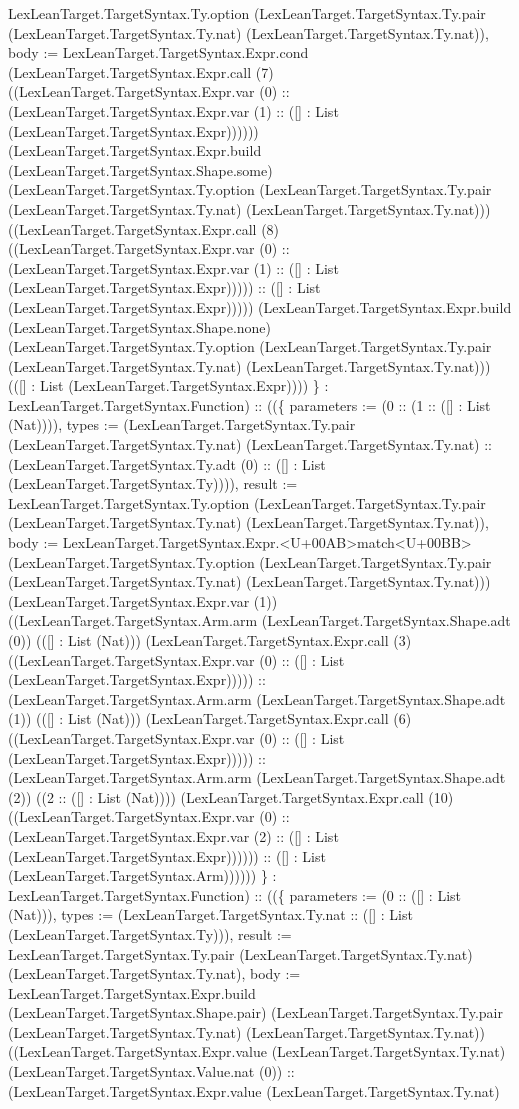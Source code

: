 \documentclass[11pt]{article}
\begin{document}
LexLeanTarget.TargetSyntax.Ty.option (LexLeanTarget.TargetSyntax.Ty.pair (LexLeanTarget.TargetSyntax.Ty.nat) (LexLeanTarget.TargetSyntax.Ty.nat)), body := LexLeanTarget.TargetSyntax.Expr.cond (LexLeanTarget.TargetSyntax.Expr.call (7) ((LexLeanTarget.TargetSyntax.Expr.var (0) :: (LexLeanTarget.TargetSyntax.Expr.var (1) :: ([] : List (LexLeanTarget.TargetSyntax.Expr)))))) (LexLeanTarget.TargetSyntax.Expr.build (LexLeanTarget.TargetSyntax.Shape.some) (LexLeanTarget.TargetSyntax.Ty.option (LexLeanTarget.TargetSyntax.Ty.pair (LexLeanTarget.TargetSyntax.Ty.nat) (LexLeanTarget.TargetSyntax.Ty.nat))) ((LexLeanTarget.TargetSyntax.Expr.call (8) ((LexLeanTarget.TargetSyntax.Expr.var (0) :: (LexLeanTarget.TargetSyntax.Expr.var (1) :: ([] : List (LexLeanTarget.TargetSyntax.Expr))))) :: ([] : List (LexLeanTarget.TargetSyntax.Expr))))) (LexLeanTarget.TargetSyntax.Expr.build (LexLeanTarget.TargetSyntax.Shape.none) (LexLeanTarget.TargetSyntax.Ty.option (LexLeanTarget.TargetSyntax.Ty.pair (LexLeanTarget.TargetSyntax.Ty.nat) (LexLeanTarget.TargetSyntax.Ty.nat))) (([] : List (LexLeanTarget.TargetSyntax.Expr)))) \} : LexLeanTarget.TargetSyntax.Function) :: ((\{ parameters := (0 :: (1 :: ([] : List (Nat)))), types := (LexLeanTarget.TargetSyntax.Ty.pair (LexLeanTarget.TargetSyntax.Ty.nat) (LexLeanTarget.TargetSyntax.Ty.nat) :: (LexLeanTarget.TargetSyntax.Ty.adt (0) :: ([] : List (LexLeanTarget.TargetSyntax.Ty)))), result := LexLeanTarget.TargetSyntax.Ty.option (LexLeanTarget.TargetSyntax.Ty.pair (LexLeanTarget.TargetSyntax.Ty.nat) (LexLeanTarget.TargetSyntax.Ty.nat)), body := LexLeanTarget.TargetSyntax.Expr.<U+00AB>match<U+00BB> (LexLeanTarget.TargetSyntax.Ty.option (LexLeanTarget.TargetSyntax.Ty.pair (LexLeanTarget.TargetSyntax.Ty.nat) (LexLeanTarget.TargetSyntax.Ty.nat))) (LexLeanTarget.TargetSyntax.Expr.var (1)) ((LexLeanTarget.TargetSyntax.Arm.arm (LexLeanTarget.TargetSyntax.Shape.adt (0)) (([] : List (Nat))) (LexLeanTarget.TargetSyntax.Expr.call (3) ((LexLeanTarget.TargetSyntax.Expr.var (0) :: ([] : List (LexLeanTarget.TargetSyntax.Expr))))) :: (LexLeanTarget.TargetSyntax.Arm.arm (LexLeanTarget.TargetSyntax.Shape.adt (1)) (([] : List (Nat))) (LexLeanTarget.TargetSyntax.Expr.call (6) ((LexLeanTarget.TargetSyntax.Expr.var (0) :: ([] : List (LexLeanTarget.TargetSyntax.Expr))))) :: (LexLeanTarget.TargetSyntax.Arm.arm (LexLeanTarget.TargetSyntax.Shape.adt (2)) ((2 :: ([] : List (Nat)))) (LexLeanTarget.TargetSyntax.Expr.call (10) ((LexLeanTarget.TargetSyntax.Expr.var (0) :: (LexLeanTarget.TargetSyntax.Expr.var (2) :: ([] : List (LexLeanTarget.TargetSyntax.Expr)))))) :: ([] : List (LexLeanTarget.TargetSyntax.Arm)))))) \} : LexLeanTarget.TargetSyntax.Function) :: ((\{ parameters := (0 :: ([] : List (Nat))), types := (LexLeanTarget.TargetSyntax.Ty.nat :: ([] : List (LexLeanTarget.TargetSyntax.Ty))), result := LexLeanTarget.TargetSyntax.Ty.pair (LexLeanTarget.TargetSyntax.Ty.nat) (LexLeanTarget.TargetSyntax.Ty.nat), body := LexLeanTarget.TargetSyntax.Expr.build (LexLeanTarget.TargetSyntax.Shape.pair) (LexLeanTarget.TargetSyntax.Ty.pair (LexLeanTarget.TargetSyntax.Ty.nat) (LexLeanTarget.TargetSyntax.Ty.nat)) ((LexLeanTarget.TargetSyntax.Expr.value (LexLeanTarget.TargetSyntax.Ty.nat) (LexLeanTarget.TargetSyntax.Value.nat (0)) :: (LexLeanTarget.TargetSyntax.Expr.value (LexLeanTarget.TargetSyntax.Ty.nat) 
\end{document}
